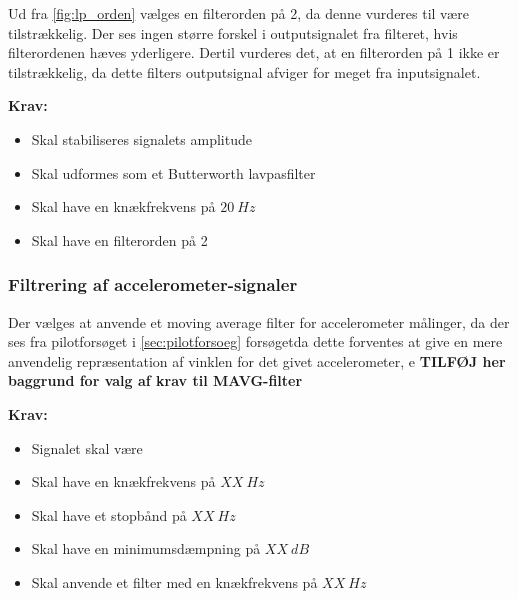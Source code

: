\noindent
Ud fra \ref{fig:lp_orden} vælges en filterorden på 2, da denne vurderes til være tilstrækkelig. Der ses ingen større forskel i outputsignalet fra filteret, hvis filterordenen hæves yderligere. Dertil vurderes det, at en filterorden på 1 ikke er tilstrækkelig, da dette filters outputsignal afviger for meget fra inputsignalet. 

\vspace{3mm}

\textbf{Krav:}
\begin{itemize}
\item Skal stabiliseres signalets amplitude
\item Skal udformes som et Butterworth lavpasfilter
\item Skal have en knækfrekvens på $20~Hz$
\item Skal have en filterorden på 2
\end{itemize}


\subsubsection{Filtrering af accelerometer-signaler}
Der vælges at anvende et moving average filter for accelerometer målinger, da der ses fra pilotforsøget i \autoref{sec:pilotforsoeg}  forsøgetda dette forventes at give en mere anvendelig repræsentation af vinklen for det givet accelerometer, e
\textbf{TILFØJ her baggrund for valg af krav til MAVG-filter}
\vspace{3mm}

\textbf{Krav:}
\begin{itemize}
\item Signalet skal være 
\item Skal have en knækfrekvens på $XX~Hz$
\item Skal have et stopbånd på $XX~Hz$
\item Skal have en minimumsdæmpning på $XX~dB$
\item Skal anvende et filter med en knækfrekvens på $XX~Hz$
\end{itemize}
